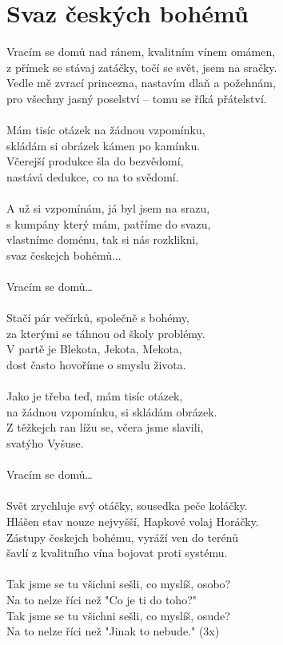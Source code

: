 \section{Svaz českých bohémů}
Vracím se domů nad ránem, kvalitním vínem omámen,\\
z přímek se stávaj zatáčky, točí se svět, jsem na sračky.\\
Vedle mě zvrací princezna, nastavím dlaň a požehnám,\\
pro všechny jasný poselství – tomu se říká přátelství.\\
\\
Mám tisíc otázek na žádnou vzpomínku,\\
skládám si obrázek kámen po kamínku.\\
Včerejší produkce šla do bezvědomí,\\
nastává dedukce, co na to svědomí.\\
\\
A už si vzpomínám, já byl jsem na srazu,\\
s kumpány který mám, patříme do svazu,\\
vlastníme doménu, tak si nás rozklikni,\\
svaz českejch bohémů...\\
\\
Vracím se domů…\\
\\
Stačí pár večírků, společně s bohémy,\\
za kterými se táhnou od školy problémy.\\
V partě je Blekota, Jekota, Mekota,\\
dost často hovoříme o smyslu života.\\
\\
Jako je třeba teď, mám tisíc otázek,\\
na žádnou vzpomínku, si skládám obrázek.\\
Z těžkejch ran lížu se, včera jsme slavili,\\
svatýho Vyšuse.\\
\\
Vracím se domů…\\
\\
Svět zrychluje svý otáčky, sousedka peče koláčky.\\
Hlášen stav nouze nejvyšší, Hapkové volaj Horáčky.\\
Zástupy českejch bohému, vyráží ven do terénů\\
šavlí z kvalitního vína bojovat proti systému.\\
\\
Tak jsme se tu všichni sešli, co myslíš, osobo?\\
Na to nelze říci než "Co je ti do toho?"\\
Tak jsme se tu všichni sešli, co myslíš, osude?\\
Na to nelze říci než "Jinak to nebude."  (3x)\\
